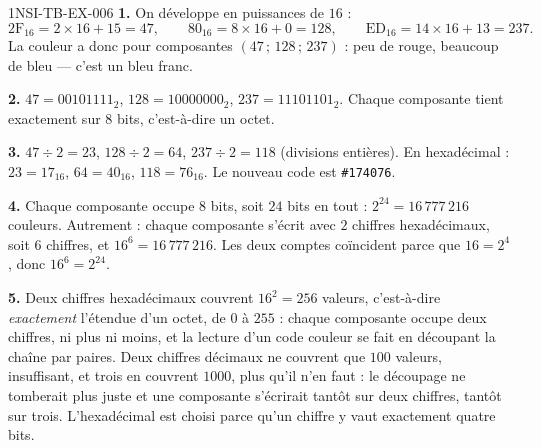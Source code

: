 \begin{corrige}{1NSI-TB-EX-006}
\textbf{1.} On développe en puissances de $16$ :
\[
  \text{2F}_{16}=2\times 16+15=47,\qquad
  \text{80}_{16}=8\times 16+0=128,\qquad
  \text{ED}_{16}=14\times 16+13=237.
\]
La couleur a donc pour composantes $(47\,;\,128\,;\,237)$ : peu de rouge,
beaucoup de bleu — c'est un bleu franc.

\textbf{2.} $47=00101111_2$, $128=10000000_2$, $237=11101101_2$. Chaque
composante tient exactement sur $8$ bits, c'est-à-dire un octet.

\textbf{3.} $47\div 2=23$, $128\div 2=64$, $237\div 2=118$ (divisions
entières). En hexadécimal : $23=\text{17}_{16}$, $64=\text{40}_{16}$,
$118=\text{76}_{16}$. Le nouveau code est \lstinline{#174076}.

\textbf{4.} Chaque composante occupe $8$ bits, soit $24$ bits en tout :
$2^{24}=16\,777\,216$ couleurs. Autrement : chaque composante s'écrit avec
$2$ chiffres hexadécimaux, soit $6$ chiffres, et $16^6=16\,777\,216$. Les deux
comptes coïncident parce que $16=2^4$, donc $16^6=2^{24}$.

\textbf{5.} Deux chiffres hexadécimaux couvrent $16^2=256$ valeurs, c'est-à-dire
\emph{exactement} l'étendue d'un octet, de $0$ à $255$ : chaque composante
occupe deux chiffres, ni plus ni moins, et la lecture d'un code couleur se fait
en découpant la chaîne par paires. Deux chiffres décimaux ne couvrent que $100$
valeurs, insuffisant, et trois en couvrent $1000$, plus qu'il n'en faut : le
découpage ne tomberait plus juste et une composante s'écrirait tantôt sur deux
chiffres, tantôt sur trois. L'hexadécimal est choisi parce qu'un chiffre y vaut
exactement quatre bits.
\end{corrige}
